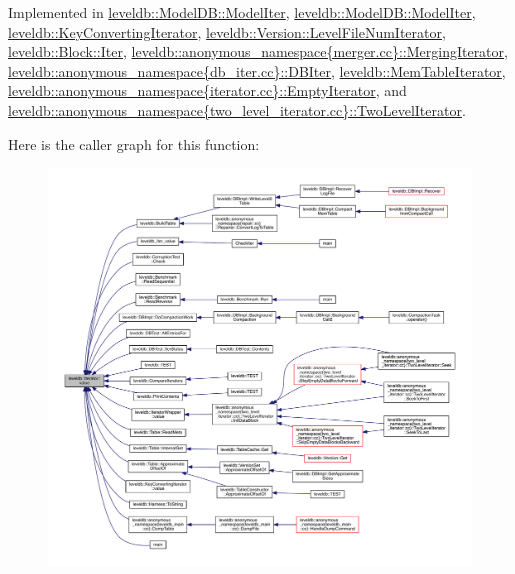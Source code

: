 Implemented in \hyperlink{classleveldb_1_1_model_d_b_1_1_model_iter_ad18eafbd733612fbe9f002b56334d871}{leveldb\+::\+Model\+D\+B\+::\+Model\+Iter}, \hyperlink{classleveldb_1_1_model_d_b_1_1_model_iter_ad18eafbd733612fbe9f002b56334d871}{leveldb\+::\+Model\+D\+B\+::\+Model\+Iter}, \hyperlink{classleveldb_1_1_key_converting_iterator_aa7a0281f93fbd520bf54d94bac77197a}{leveldb\+::\+Key\+Converting\+Iterator}, \hyperlink{classleveldb_1_1_version_1_1_level_file_num_iterator_ac09a8ed595aca29d90e6af91e80a4f00}{leveldb\+::\+Version\+::\+Level\+File\+Num\+Iterator}, \hyperlink{classleveldb_1_1_block_1_1_iter_afb28e69efec54ca9306fc504e139bf3f}{leveldb\+::\+Block\+::\+Iter}, \hyperlink{classleveldb_1_1anonymous__namespace_02merger_8cc_03_1_1_merging_iterator_aac4d0e5e62b3e3aec7c7e4c8467c9fe0}{leveldb\+::anonymous\+\_\+namespace\{merger.\+cc\}\+::\+Merging\+Iterator}, \hyperlink{classleveldb_1_1anonymous__namespace_02db__iter_8cc_03_1_1_d_b_iter_a1ec1d37cc4efbfcd0ecc2dfd9d1881c4}{leveldb\+::anonymous\+\_\+namespace\{db\+\_\+iter.\+cc\}\+::\+D\+B\+Iter}, \hyperlink{classleveldb_1_1_mem_table_iterator_a5910c8d44980cdec2d8ba603aabb98b8}{leveldb\+::\+Mem\+Table\+Iterator}, \hyperlink{classleveldb_1_1anonymous__namespace_02iterator_8cc_03_1_1_empty_iterator_a7e0b106224faefb1961cb25d7d65a4d8}{leveldb\+::anonymous\+\_\+namespace\{iterator.\+cc\}\+::\+Empty\+Iterator}, and \hyperlink{classleveldb_1_1anonymous__namespace_02two__level__iterator_8cc_03_1_1_two_level_iterator_a6357dcca6de355676bab5a4029bf958c}{leveldb\+::anonymous\+\_\+namespace\{two\+\_\+level\+\_\+iterator.\+cc\}\+::\+Two\+Level\+Iterator}.



Here is the caller graph for this function\+:
\nopagebreak
\begin{figure}[H]
\begin{center}
\leavevmode
\includegraphics[width=350pt]{classleveldb_1_1_iterator_a613ac2e965518aad7a064c64c72bcf7c_icgraph}
\end{center}
\end{figure}




